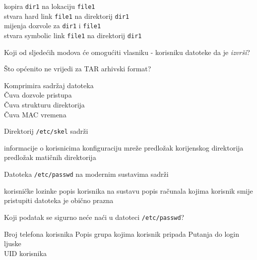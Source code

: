 \documentclass[a4paper,11pt]{exam}
\newcommand{\shell}[1]{\texttt{#1}}
\begin{document}
\begin{questions}
	\begin{oneparchoices}
		\choice kopira \shell{dir1} na lokaciju \shell{file1} \\
		\CorrectChoice stvara hard link \shell{file1} na direktorij \shell{dir1} \\
		\choice mijenja dozvole za \shell{dir1} i \shell{file1} \\
		\choice stvara symbolic link \shell{file1} na direktorij \shell{dir1}
	\end{oneparchoices}
	
	\question
	Koji od sljedećih modova će omogućiti vlasniku - korisniku datoteke da je \textit{izvrši}?
	
	\begin{oneparchoices}
		\choice 4400
		\choice 440
		\CorrectChoice 540
		\choice 640 
	\end{oneparchoices}
	
	\question
	Što općenito ne vrijedi za TAR arhivski format?
	
	\begin{oneparchoices}
		\CorrectChoice Komprimira sadržaj datoteka \\
		\choice Čuva dozvole pristupa \\
		\choice Čuva strukturu direktorija \\
		\choice Čuva MAC vremena
	\end{oneparchoices}

	\question
	Direktorij \shell{/etc/skel} sadrži
	
	\begin{oneparchoices}
		\choice informacije o korisnicima 
		\choice konfiguraciju mreže 
		\choice predložak korijenskog direktorija \\
		\CorrectChoice predložak matičnih direktorija 
	\end{oneparchoices}
	
	\question
	Datoteka \shell{/etc/passwd} na modernim sustavima sadrži
	
	\begin{oneparchoices}
		\choice korisničke lozinke 
		\CorrectChoice popis korisnika na sustavu
		\choice popis računala kojima korisnik smije pristupiti
		\choice datoteka je obično prazna 
	\end{oneparchoices}
	
	\question
	Koji podatak se sigurno neće naći u datoteci \shell{/etc/passwd}?
	
	\begin{oneparchoices}
		\choice Broj telefona korisnika
		\CorrectChoice Popis grupa kojima korisnik pripada
		\choice Putanja do login ljuske \\
		\choice UID korisnika
	\end{oneparchoices}
	

\end{questions}
\end{document}
